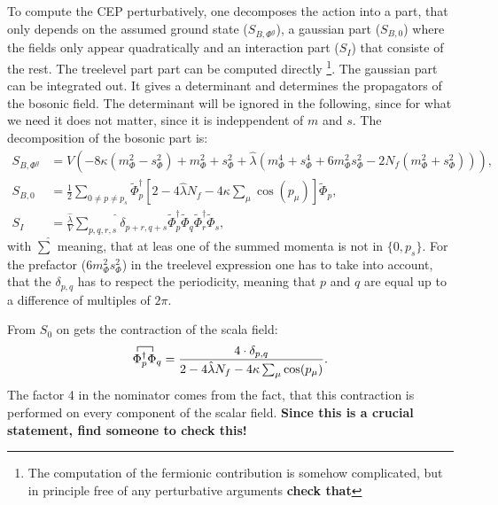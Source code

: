 To compute the CEP perturbatively, one decomposes the action into a part, that only depends on the assumed ground state ($S_{B,\Phi^g}$), 
a gaussian part ($S_{B,0}$) where the fields only appear quadratically and an interaction part ($S_I$) that consiste of the rest. The treelevel part 
part can be computed directly \footnote{The computation of the fermionic contribution is somehow complicated, but in principle 
free of any perturbative arguments \textbf{check that}}.  The gaussian part can be integrated out. It gives a determinant and determines the propagators 
of the bosonic field. The determinant will be ignored in the following, since for what we need it does not matter, since it is indeppendent of $m$ and $s$.
The decomposition of the bosonic part is:
\begin{align}
 S_{B,\Phi^g} &= V \left( -8 \kappa \left( m_{\Phi}^2 - s_{\Phi}^2 \right)  +  m_{\Phi}^2 + s_{\Phi}^2 
             + \hat\lambda \left( m_{\Phi}^4 + s_{\Phi}^4 + 6 m_{\Phi}^2s_{\Phi}^2 - 2 N_f \left(m_{\Phi}^2 + s_{\Phi}^2\right) \right) \right) ,
             \label{eq:BosonicTreelevelCEP} \\
 S_{B,0}      &= \frac{1}{2}  \sum\limits_{0\neq p \neq p_s}  \tilde\Phi_p^{\dagger}  
              \left[ 2 - 4 \hat\lambda N_f - 4 \kappa \sum_{\mu} \cos(p_{\mu}) \right]  \tilde\Phi_p ,
              \label{eq:BosonicGaussianCEP} \\
 S_I        &= \frac{\hat\lambda}{V} \hat{\sum\limits_{p,q,r,s}}\delta_{p+r,q+s} \tilde\Phi_p^{\dagger} \tilde\Phi_q \tilde\Phi_r^{\dagger} \tilde\Phi_s,
              \label{eq:BosonicInteractionCEP}
\end{align}
with $\hat\sum$ meaning, that at leas one of the summed momenta is not in $\{0,p_s\}$. For the prefactor ($6 m_{\Phi}^2s_{\Phi}^2$) in the treelevel 
expression one has to take into account, that the $\delta_{p,q}$ has to respect the periodicity, meaning that $p$ and $q$ are equal up to a 
difference of multiples of $2\pi$.

From $S_0$ on gets the contraction of the scala field:
\begin{equation}\label{eq:ContractionOfBosonicField}
 \contraction{}{\Phi}{{}^\dagger_p}{\Phi{}}  \Phi^\dagger_p \Phi_q = \frac{4 \cdot \delta_{p,q}}{2 - 4 \hat\lambda N_f - 4 \kappa \sum_{\mu} \cos(p_{\mu}) }.
\end{equation}
The factor 4 in the nominator comes from the fact, that this contraction is performed on every component of the scalar field. \textbf{Since this is a crucial statement, find someone to check this!}

